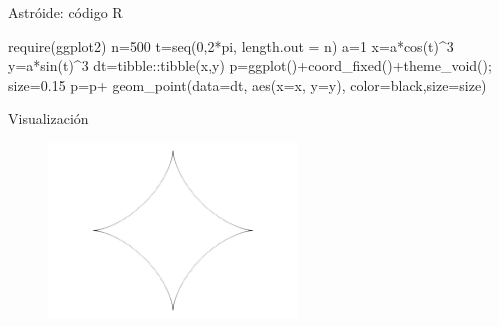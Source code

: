 \documentclass[
  ignorenonframetext,
]{beamer}
\newenvironment{Shaded}{\begin{snugshade}}{\end{snugshade}}
\newcommand{\AttributeTok}[1]{\textcolor[rgb]{0.40,0.45,0.13}{#1}}
\newcommand{\DecValTok}[1]{\textcolor[rgb]{0.68,0.00,0.00}{#1}}
\newcommand{\FloatTok}[1]{\textcolor[rgb]{0.68,0.00,0.00}{#1}}
\newcommand{\FunctionTok}[1]{\textcolor[rgb]{0.28,0.35,0.67}{#1}}
\newcommand{\NormalTok}[1]{\textcolor[rgb]{0.00,0.23,0.31}{#1}}
\newcommand{\OtherTok}[1]{\textcolor[rgb]{0.00,0.23,0.31}{#1}}
\newcommand{\SpecialCharTok}[1]{\textcolor[rgb]{0.37,0.37,0.37}{#1}}
\newcommand{\StringTok}[1]{\textcolor[rgb]{0.13,0.47,0.30}{#1}}
\begin{document}
\begin{frame}[fragile]{Astróide: código R}
\protect\hypertarget{astruxf3ide-cuxf3digo-r}{}
\begin{Shaded}
\begin{Highlighting}[]
    \FunctionTok{require}\NormalTok{(ggplot2)}
\NormalTok{    n}\OtherTok{=}\DecValTok{500}
\NormalTok{    t}\OtherTok{=}\FunctionTok{seq}\NormalTok{(}\DecValTok{0}\NormalTok{,}\DecValTok{2}\SpecialCharTok{*}\NormalTok{pi, }\AttributeTok{length.out =}\NormalTok{ n)}
\NormalTok{    a}\OtherTok{=}\DecValTok{1}
\NormalTok{    x}\OtherTok{=}\NormalTok{a}\SpecialCharTok{*}\FunctionTok{cos}\NormalTok{(t)}\SpecialCharTok{\^{}}\DecValTok{3}
\NormalTok{    y}\OtherTok{=}\NormalTok{a}\SpecialCharTok{*}\FunctionTok{sin}\NormalTok{(t)}\SpecialCharTok{\^{}}\DecValTok{3}
\NormalTok{    dt}\OtherTok{=}\NormalTok{tibble}\SpecialCharTok{::}\FunctionTok{tibble}\NormalTok{(x,y)}
\NormalTok{    p}\OtherTok{=}\FunctionTok{ggplot}\NormalTok{()}\SpecialCharTok{+}\FunctionTok{coord\_fixed}\NormalTok{()}\SpecialCharTok{+}\FunctionTok{theme\_void}\NormalTok{();}
\NormalTok{    size}\OtherTok{=}\FloatTok{0.15}
\NormalTok{    p}\OtherTok{=}\NormalTok{p}\SpecialCharTok{+} \FunctionTok{geom\_point}\NormalTok{(}\AttributeTok{data=}\NormalTok{dt, }\FunctionTok{aes}\NormalTok{(}\AttributeTok{x=}\NormalTok{x, }\AttributeTok{y=}\NormalTok{y),}
                    \AttributeTok{color=}\StringTok{\textquotesingle{}black\textquotesingle{}}\NormalTok{,}\AttributeTok{size=}\NormalTok{size)}
\end{Highlighting}
\end{Shaded}
\end{frame}

\begin{frame}{Visualización}
\protect\hypertarget{visualizaciuxf3n-1}{}
\begin{figure}

{\centering \includegraphics[width=2.60417in,height=\textheight]{Teste_quarto_files/figure-beamer/unnamed-chunk-14-1.pdf}

}

\end{figure}
\end{frame}
\end{document}
